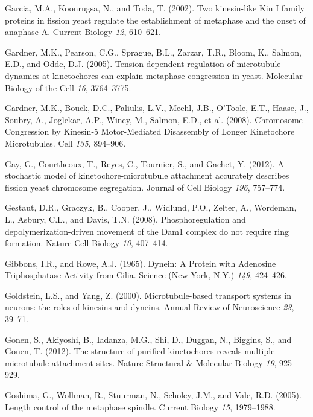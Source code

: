 \documentclass[12pt,a4paper,twoside,openright]{book}
\begin{document}
\hypertarget{ref-Garcia2002d}{}
Garcia, M.A., Koonrugsa, N., and Toda, T. (2002). Two kinesin-like Kin I
family proteins in fission yeast regulate the establishment of metaphase
and the onset of anaphase A. Current Biology \emph{12}, 610--621.

\hypertarget{ref-Gardner2005}{}
Gardner, M.K., Pearson, C.G., Sprague, B.L., Zarzar, T.R., Bloom, K.,
Salmon, E.D., and Odde, D.J. (2005). Tension-dependent regulation of
microtubule dynamics at kinetochores can explain metaphase congression
in yeast. Molecular Biology of the Cell \emph{16}, 3764--3775.

\hypertarget{ref-Gardner2008a}{}
Gardner, M.K., Bouck, D.C., Paliulis, L.V., Meehl, J.B., O'Toole, E.T.,
Haase, J., Soubry, A., Joglekar, A.P., Winey, M., Salmon, E.D., et al.
(2008). Chromosome Congression by Kinesin-5 Motor-Mediated Disassembly
of Longer Kinetochore Microtubules. Cell \emph{135}, 894--906.

\hypertarget{ref-Gay2012a}{}
Gay, G., Courtheoux, T., Reyes, C., Tournier, S., and Gachet, Y. (2012).
A stochastic model of kinetochore-microtubule attachment accurately
describes fission yeast chromosome segregation. Journal of Cell Biology
\emph{196}, 757--774.

\hypertarget{ref-Gestaut2008}{}
Gestaut, D.R., Graczyk, B., Cooper, J., Widlund, P.O., Zelter, A.,
Wordeman, L., Asbury, C.L., and Davis, T.N. (2008). Phosphoregulation
and depolymerization-driven movement of the Dam1 complex do not require
ring formation. Nature Cell Biology \emph{10}, 407--414.

\hypertarget{ref-Gibbons1965}{}
Gibbons, I.R., and Rowe, A.J. (1965). Dynein: A Protein with Adenosine
Triphosphatase Activity from Cilia. Science (New York, N.Y.) \emph{149},
424--426.

\hypertarget{ref-Goldstein2000}{}
Goldstein, L.S., and Yang, Z. (2000). Microtubule-based transport
systems in neurons: the roles of kinesins and dyneins. Annual Review of
Neuroscience \emph{23}, 39--71.

\hypertarget{ref-Gonen2012a}{}
Gonen, S., Akiyoshi, B., Iadanza, M.G., Shi, D., Duggan, N., Biggins,
S., and Gonen, T. (2012). The structure of purified kinetochores reveals
multiple microtubule-attachment sites. Nature Structural \& Molecular
Biology \emph{19}, 925--929.

\hypertarget{ref-Goshima2005}{}
Goshima, G., Wollman, R., Stuurman, N., Scholey, J.M., and Vale, R.D.
(2005). Length control of the metaphase spindle. Current Biology
\emph{15}, 1979--1988.
\end{document}
